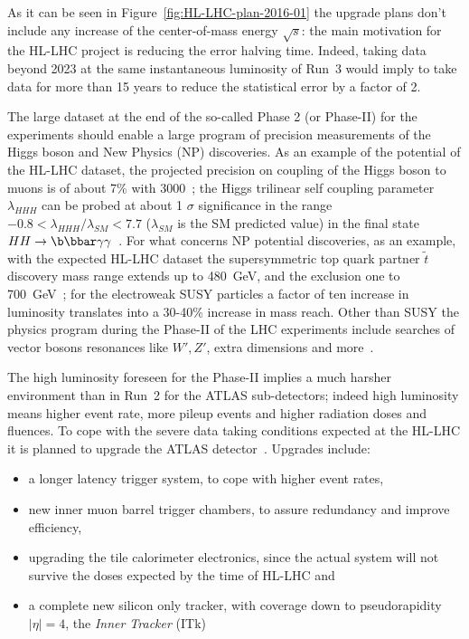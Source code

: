 As it can be seen in Figure~\ref{fig:HL-LHC-plan-2016-01} the upgrade plans don't include any increase 
of the center-of-mass energy $\sqrt{s}$: the main motivation for the HL-LHC project is 
reducing the error halving time. Indeed, taking data beyond 2023 at the same instantaneous luminosity of 
Run~3 would imply  to take data for more than 15 years to reduce the statistical error by a factor of 2.

The large dataset at the end of the so-called Phase 2 (or {\it} Phase-II) for the experiments should enable 
a  large program of precision measurements of the Higgs boson and New Physics (NP) discoveries. 
As an example of the potential of the HL-LHC dataset, the projected precision on coupling of the Higgs
 boson to muons is of about 7\% with  3000~\invfb; the Higgs 
trilinear self coupling parameter $\lambda_{HHH}$ can be probed at about 1 $\sigma$ significance 
in the range $-0.8<\lambda_{HHH}/\lambda_{SM}<7.7$ ($\lambda_{SM}$ is the SM predicted value) 
in the final state $HH\to\b\bbar\gamma\gamma$~\cite{ATL-PHYS-PUB-2014-016}. 
For what concerns NP potential discoveries, as an example, with the expected HL-LHC dataset the 
supersymmetric top quark partner $\widetilde{t}$ discovery mass range extends up to 480~GeV, and the exclusion one to 700~GeV~\cite{ATL-PHYS-PUB-2016-022};
for the electroweak SUSY particles a factor of ten increase in luminosity translates into a 30-40\% increase in mass reach. Other than SUSY the physics program 
during the Phase-II of the LHC experiments include searches of   vector bosons resonances like 
$W',Z'$, 
extra dimensions and more~\cite{ATLASLoIPhaseII}.

The high luminosity foreseen for the Phase-II implies a much harsher environment than in Run~2 
for the ATLAS sub-detectors; indeed high luminosity means higher event rate, more pileup events 
and higher radiation doses and fluences. 
To cope with the severe data taking conditions expected at the HL-LHC it is planned to 
upgrade the  ATLAS detector~\cite{ATLASLoIPhaseII,ATLASITkScopingDocument}. Upgrades include:

\begin{itemize}
\item a longer latency trigger system, to cope with higher event rates,
\item new inner muon barrel trigger chambers, to assure redundancy and improve efficiency,
\item upgrading the tile calorimeter electronics, since the actual system will not survive the doses expected by the time of HL-LHC and
\item a complete new silicon only tracker, with coverage down to pseudorapidity $|\eta|=4$, the {\it Inner Tracker} (ITk)
\end{itemize} 

